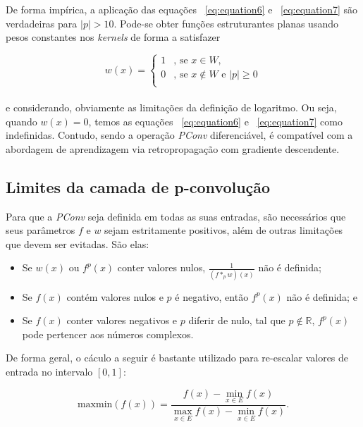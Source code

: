 De forma impírica, a aplicação das equações ~\ref{eq:equation6} e ~\ref{eq:equation7} são verdadeiras para $|p| > 10$.
Pode-se obter funções estruturantes planas usando pesos constantes nos \emph{kernels} de forma a satisfazer

\begin{equation}
    w(x) = \begin{cases}
               1    & \text{, se } x \in W,                         \\
               0    & \text{, se } x \notin W \text{ e } |p| \geq 0 \\
    \end{cases}
    \label{eq:equation8}
\end{equation}
\\
e considerando, obviamente as limitações da definição de logaritmo.
Ou seja, quando $w(x) = 0$, temos as equações ~\ref{eq:equation6} e ~\ref{eq:equation7} como indefinidas.
Contudo, sendo a operação \emph{PConv} diferenciável, é compatível com a abordagem de aprendizagem via retropropagação com gradiente descendente.


\subsection{Limites da camada de p-convolução}
\label{subsec:limites-da-camada-de-p-convolucao}

Para que a \emph{PConv} seja definida em todas as suas entradas, são necessários que seus parâmetros $f$ e $w$ sejam estritamente positivos, além de outras limitações que devem ser evitadas.
São elas:

\begin{itemize}
    \item Se $w(x)$ ou $f^{p}(x)$ conter valores nulos, $\frac{1}{(f*_{p}w)(x)}$ não é definida;
    \item Se $f(x)$ contém valores nulos e $p$ é negativo, então $f^{p}(x)$ não é definida;
    e
    \item Se $f(x)$ conter valores negativos e $p$ diferir de nulo, tal que $p \notin \mathbb{R}$, $f^{p}(x)$ pode pertencer aos números complexos.
\end{itemize}

De forma geral, o cáculo a seguir é bastante utilizado para re-escalar valores de entrada no intervalo $[0, 1]$:

\begin{equation}
    \text{maxmin}(f(x)) = \frac{f(x) - \min_{x \in E}f(x)}{\max_{x \in E}f(x) - \min_{x \in E}f(x)}.
    \label{eq:equation9}
\end{equation}

